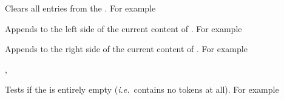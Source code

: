 \documentclass[oneside]{book}
\begin{document}
\begin{function}{\TlClear}
\begin{syntax}
 
\end{syntax}
Clears all entries from the . For example
\begin{demo}
\TlSet{}
\TlClear\lTmpjTl
\TlSet{}
\TlUse\lTmpjTl
\end{demo}
\end{function}

\begin{function}{\TlPutLeft}
\begin{syntax}
  
\end{syntax}
Appends  to the left side of the current content of
. For example
\begin{demo}
\TlSet{}
\TlPutLeft{}
\TlUse\lTmpkTl
\end{demo}
\end{function}

\begin{function}{\TlPutRight}
\begin{syntax}
  
\end{syntax}
Appends  to the right side of the current content of
. For example
\begin{demo}
\TlSet{}
\TlPutRight{}
\TlUse\lTmpkTl
\end{demo}
\end{function}

\begin{function}{\TlIfEmpty,\TlIfEmptyTF}
\begin{syntax}
 
   
\end{syntax}
Tests if the  is entirely empty
(\emph{i.e.}~contains no tokens at all). For example
\begin{demo}
\TlSet{}
\TlIfEmptyTF{}
\TlClear\lTmpaTl
\TlIfEmptyTF{}
\end{demo}
\end{function}
\end{document}

